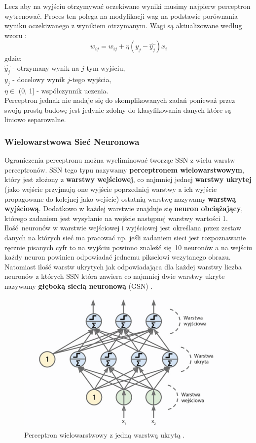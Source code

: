 \documentclass{article}
\begin{document}
Lecz aby na wyjściu otrzymywać oczekiwane wyniki musimy najpierw perceptron wytrenować. Proces
ten polega na modyfikacji wag na podstawie porównania wyniku oczekiwanego z wynikiem otrzymanym.
Wagi są aktualizowane według wzoru \cite{um}:
\begin{equation}
	w_{ij} = w_{ij} + \eta(y_j - \hat{y_j})x_i
\end{equation}
gdzie:\\
$\hat{y_j}$ - otrzymany wynik na $j$-tym wyjściu,\\
$y_j$ - docelowy wynik $j$-tego wyjścia,\\
$\eta \in$ (0, 1] - współczynnik uczenia.\\
Perceptron jednak nie nadaje się do skomplikowanych zadań ponieważ przez swoją prostą budowę
jest jedynie zdolny do klasyfikowania danych które są liniowo separowalne.

\subsubsection{Wielowarstwowa Sieć Neuronowa}
Ograniczenia perceptronu można wyeliminować tworząc SSN z wielu warstw perceptronów.
SSN tego typu nazywamy \textbf{perceptronem wielowarstwowym}, który jest złożony z 
\textbf{warstwy wejściowej}, co najmniej jednej \textbf{warstwy ukrytej} (jako wejście przyjmują
one wyjście poprzedniej warstwy a ich wyjście propagowane do kolejnej jako wejście) ostatnią
warstwę nazywamy \textbf{warstwą wyjściową}. Dodatkowo w każdej warstwie znajduje się 
\textbf{neuron obciążający}, którego zadaniem jest wysyłanie na wejście następnej warstwy 
wartości 1. Ilość neuronów w warstwie wejściowej i wyjściowej jest określana przez
zestaw danych na których sieć ma pracować np. jeśli zadaniem sieci jest rozpoznawanie
ręcznie pisanych cyfr to na wyjściu powinno znaleźć się 10 neuronów a na wejściu każdy neuron
powinien odpowiadać jednemu pikselowi wczytanego obrazu. Natomiast ilość warstw ukrytych
jak odpowiadająca dla każdej warstwy liczba neuronów z których
SSN która zawiera co najmniej dwie warstwy ukryte nazywamy
\textbf{głęboką siecią neuronową} (GSN) \cite{um}.

\begin{figure}[H]
\centering
\includegraphics[scale=0.5]{gsn.png}
\caption{Perceptron wielowarstwowy z jedną warstwą ukrytą \cite{um}.}
\end{figure}
\end{document}
